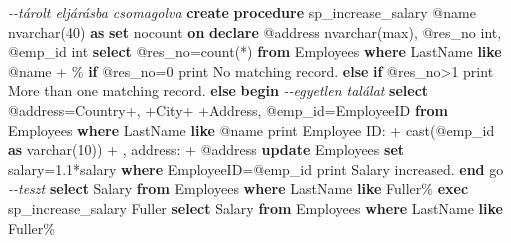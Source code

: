 \documentclass[
  magyar,
]{article}
\newenvironment{Shaded}{}{}
\newcommand{\CommentTok}[1]{\textcolor[rgb]{0.38,0.63,0.69}{\textit{#1}}}
\newcommand{\ControlFlowTok}[1]{\textcolor[rgb]{0.00,0.44,0.13}{\textbf{#1}}}
\newcommand{\DataTypeTok}[1]{\textcolor[rgb]{0.56,0.13,0.00}{#1}}
\newcommand{\DecValTok}[1]{\textcolor[rgb]{0.25,0.63,0.44}{#1}}
\newcommand{\FloatTok}[1]{\textcolor[rgb]{0.25,0.63,0.44}{#1}}
\newcommand{\FunctionTok}[1]{\textcolor[rgb]{0.02,0.16,0.49}{#1}}
\newcommand{\KeywordTok}[1]{\textcolor[rgb]{0.00,0.44,0.13}{\textbf{#1}}}
\newcommand{\NormalTok}[1]{#1}
\newcommand{\OperatorTok}[1]{\textcolor[rgb]{0.40,0.40,0.40}{#1}}
\newcommand{\StringTok}[1]{\textcolor[rgb]{0.25,0.44,0.63}{#1}}
\begin{document}
\begin{Shaded}
\begin{Highlighting}[]
\CommentTok{{-}{-}tárolt eljárásba csomagolva}
\KeywordTok{create} \KeywordTok{procedure}\NormalTok{ sp\_increase\_salary @name }\DataTypeTok{nvarchar}\NormalTok{(}\DecValTok{40}\NormalTok{)}
\KeywordTok{as}
\KeywordTok{set}\NormalTok{ nocount }\KeywordTok{on}
\KeywordTok{declare}\NormalTok{ @address }\DataTypeTok{nvarchar}\NormalTok{(}\FunctionTok{max}\NormalTok{), @res\_no }\DataTypeTok{int}\NormalTok{, @emp\_id }\DataTypeTok{int}
\KeywordTok{select}\NormalTok{ @res\_no}\OperatorTok{=}\FunctionTok{count}\NormalTok{(}\OperatorTok{*}\NormalTok{) }\KeywordTok{from}\NormalTok{ Employees }\KeywordTok{where}\NormalTok{ LastName }\KeywordTok{like}\NormalTok{ @name }\OperatorTok{+} \StringTok{\textquotesingle{}\%\textquotesingle{}}
\ControlFlowTok{if}\NormalTok{ @res\_no}\OperatorTok{=}\DecValTok{0}\NormalTok{ print }\StringTok{\textquotesingle{}No matching record.\textquotesingle{}}
\ControlFlowTok{else} \ControlFlowTok{if}\NormalTok{ @res\_no}\OperatorTok{\textgreater{}}\DecValTok{1}\NormalTok{ print }\StringTok{\textquotesingle{}More than one matching record.\textquotesingle{}}
\ControlFlowTok{else} \ControlFlowTok{begin} \CommentTok{{-}{-}egyetlen találat}
    \KeywordTok{select}\NormalTok{ @address}\OperatorTok{=}\NormalTok{Country}\OperatorTok{+}\StringTok{\textquotesingle{}, \textquotesingle{}}\OperatorTok{+}\NormalTok{City}\OperatorTok{+}\StringTok{\textquotesingle{} \textquotesingle{}}\OperatorTok{+}\NormalTok{Address, @emp\_id}\OperatorTok{=}\NormalTok{EmployeeID}
        \KeywordTok{from}\NormalTok{ Employees }\KeywordTok{where}\NormalTok{ LastName }\KeywordTok{like}\NormalTok{ @name}
\NormalTok{    print }\StringTok{\textquotesingle{}Employee ID: \textquotesingle{}} \OperatorTok{+} \FunctionTok{cast}\NormalTok{(@emp\_id }\KeywordTok{as} \DataTypeTok{varchar}\NormalTok{(}\DecValTok{10}\NormalTok{)) }\OperatorTok{+} \StringTok{\textquotesingle{}, address: \textquotesingle{}} \OperatorTok{+}\NormalTok{ @address}
    \KeywordTok{update}\NormalTok{ Employees }\KeywordTok{set}\NormalTok{ salary}\OperatorTok{=}\FloatTok{1.1}\OperatorTok{*}\NormalTok{salary }\KeywordTok{where}\NormalTok{ EmployeeID}\OperatorTok{=}\NormalTok{@emp\_id}
\NormalTok{    print }\StringTok{\textquotesingle{}Salary increased.\textquotesingle{}}
\ControlFlowTok{end}
\NormalTok{go}
\CommentTok{{-}{-}teszt}
\KeywordTok{select}\NormalTok{ Salary }\KeywordTok{from}\NormalTok{ Employees }\KeywordTok{where}\NormalTok{ LastName }\KeywordTok{like} \StringTok{\textquotesingle{}Fuller\%\textquotesingle{}}
\KeywordTok{exec}\NormalTok{ sp\_increase\_salary }\StringTok{\textquotesingle{}Fuller\textquotesingle{}}
\KeywordTok{select}\NormalTok{ Salary }\KeywordTok{from}\NormalTok{ Employees }\KeywordTok{where}\NormalTok{ LastName }\KeywordTok{like} \StringTok{\textquotesingle{}Fuller\%\textquotesingle{}}


\end{Highlighting}
\end{Shaded}
\end{document}
